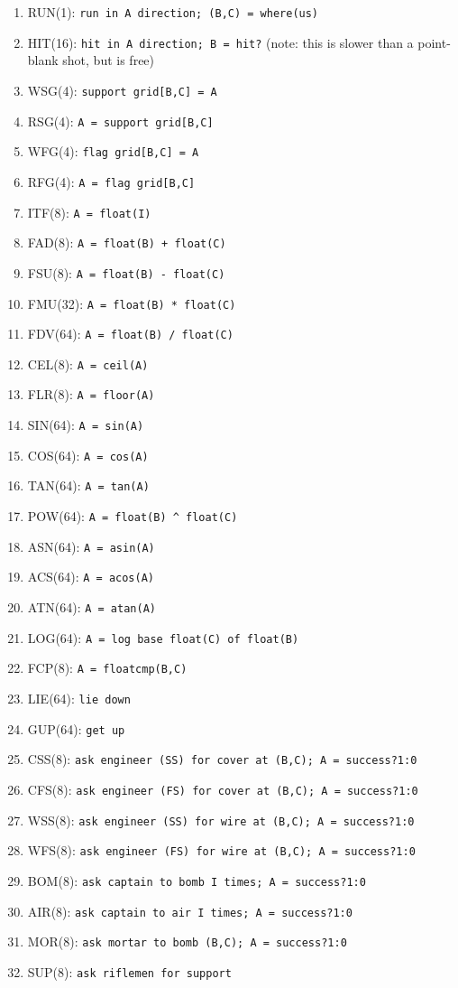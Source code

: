 \documentclass{article}
\begin{document}
\begin{enumerate}[noitemsep]
    \item RUN(1): \texttt{run in A direction; (B,C) = where(us)}
    \item HIT(16): \texttt{hit in A direction; B = hit?} (note: this is slower
        than a point-blank shot, but is free)
    \item WSG(4): \texttt{support grid[B,C] = A}
    \item RSG(4): \texttt{A = support grid[B,C]}
    \item WFG(4): \texttt{flag grid[B,C] = A}
    \item RFG(4): \texttt{A = flag grid[B,C]}
    \item ITF(8): \texttt{A = float(I)}
    \item FAD(8): \texttt{A = float(B) + float(C)}
    \item FSU(8): \texttt{A = float(B) - float(C)}
    \item FMU(32): \texttt{A = float(B) * float(C)}
    \item FDV(64): \texttt{A = float(B) / float(C)}
    \item CEL(8): \texttt{A = ceil(A)}
    \item FLR(8): \texttt{A = floor(A)}
    \item SIN(64): \texttt{A = sin(A)}
    \item COS(64): \texttt{A = cos(A)}
    \item TAN(64): \texttt{A = tan(A)}
    \item POW(64): \texttt{A = float(B) \^{} float(C)}
    \item ASN(64): \texttt{A = asin(A)}
    \item ACS(64): \texttt{A = acos(A)}
    \item ATN(64): \texttt{A = atan(A)}
    \item LOG(64): \texttt{A = log base float(C) of float(B)}
    \item FCP(8): \texttt{A = floatcmp(B,C)}
    \item LIE(64): \texttt{lie down}
    \item GUP(64): \texttt{get up}
    \item CSS(8): \texttt{ask engineer (SS) for cover at (B,C); A = success?1:0}
    \item CFS(8): \texttt{ask engineer (FS) for cover at (B,C); A = success?1:0}
    \item WSS(8): \texttt{ask engineer (SS) for wire at (B,C); A = success?1:0}
    \item WFS(8): \texttt{ask engineer (FS) for wire at (B,C); A = success?1:0}
    \item BOM(8): \texttt{ask captain to bomb I times; A = success?1:0}
    \item AIR(8): \texttt{ask captain to air I times; A = success?1:0}
    \item MOR(8): \texttt{ask mortar to bomb (B,C); A = success?1:0}
    \item SUP(8): \texttt{ask riflemen for support}
\end{enumerate}
\end{document}
